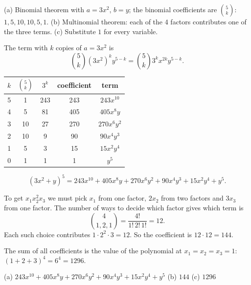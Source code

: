 \begin{solution}
	\idea (a) Binomial theorem with $a=3x^2$, $b=y$; the binomial coefficients
	are $\binom5k$: $1,5,10,10,5,1$. (b) Multinomial theorem: each of the 4
	factors contributes one of the three terms. (c) Substitute $1$ for every
	variable.

	 The term with $k$ copies of $a=3x^2$ is
	\[ \binom5k(3x^2)^ky^{5-k}=\binom5k3^kx^{2k}y^{5-k}. \]
	\begin{center}
		\begin{tabular}{ccccc}
			\toprule $k$ & $\binom5k$ & $3^k$ & coefficient & term        \\\midrule
			5            & 1          & 243   & 243         & $243x^{10}$ \\
			4            & 5          & 81    & 405         & $405x^8y$   \\
			3            & 10         & 27    & 270         & $270x^6y^2$ \\
			2            & 10         & 9     & 90          & $90x^4y^3$  \\
			1            & 5          & 3     & 15          & $15x^2y^4$  \\
			0            & 1          & 1     & 1           & $y^5$       \\\bottomrule
		\end{tabular}
	\end{center}
	\[ (3x^2+y)^5=243x^{10}+405x^8y+270x^6y^2+90x^4y^3+15x^2y^4+y^5. \]

	 To get $x_1x_2^2x_3$ we must pick $x_1$ from one factor, $2x_2$
	from two factors and $3x_3$ from one factor. The number of ways to decide
	which factor gives which term is
	\[ \binom{4}{1,2,1}=\frac{4!}{1!\,2!\,1!}=12. \]
	Each such choice contributes $1\cdot2^2\cdot3=12$. So the coefficient is
	$12\cdot12=144$.

	 The sum of all coefficients is the value of the polynomial at
	$x_1=x_2=x_3=1$: $(1+2+3)^4=6^4=1296$.
	\begin{answer}
		(a) $243x^{10}+405x^8y+270x^6y^2+90x^4y^3+15x^2y^4+y^5$ \quad
		(b) $144$ \quad (c) $1296$
	\end{answer}
\end{solution}
